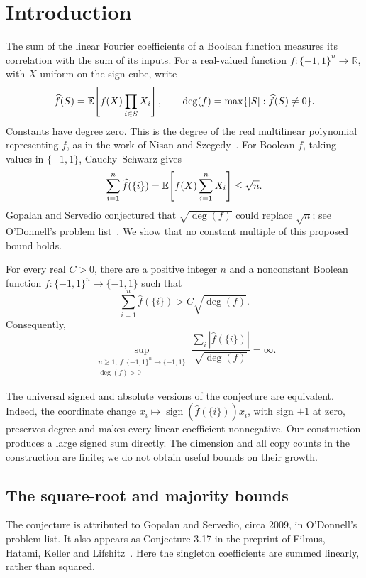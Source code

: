 \section{Introduction}

The sum of the linear Fourier coefficients of a Boolean function measures
its correlation with the sum of its inputs. For a real-valued function
\(f:\{-1,1\}^n\to\mathbb R\), with \(X\) uniform on the sign cube,
write
\[
 \widehat f(S)=\mathbb E\!\left[f(X)\prod_{i\in S}X_i\right],
 \qquad \deg(f)=\max\{|S|:\widehat f(S)\ne0\}.
\]
Constants have degree zero. This is the degree of the real multilinear
polynomial representing \(f\), as in the work of Nisan and
Szegedy~\cite{NisanSzegedy}. For Boolean \(f\), taking values in
\(\{-1,1\}\), Cauchy--Schwarz gives
\[
 \sum_{i=1}^n\widehat f(\{i\})
 =\mathbb E\!\left[f(X)\sum_{i=1}^nX_i\right]\le\sqrt n.
\]
Gopalan and Servedio conjectured that \(\sqrt{\deg(f)}\) could replace
\(\sqrt n\); see O'Donnell's problem list~\cite[p.~9]{ODonnell}.
We show that no constant multiple of this proposed bound holds.

\begin{theorem}\label{thm:main}
For every real \(C>0\), there are a positive integer \(n\) and a
nonconstant Boolean function \(f:\{-1,1\}^n\to\{-1,1\}\) such that
\[
 \sum_{i=1}^n\widehat f(\{i\})>C\sqrt{\deg(f)}.
\]
Consequently,
\[
 \sup_{\substack{n\ge1,\ f:\{-1,1\}^n\to\{-1,1\}\\\deg(f)>0}}
 \frac{\sum_i|\widehat f(\{i\})|}{\sqrt{\deg(f)}}=\infty.
\]
\end{theorem}

The universal signed and absolute versions of the conjecture are
equivalent. Indeed, the coordinate change
\(x_i\mapsto\operatorname{sign}(\widehat f(\{i\}))x_i\), with sign
\(+1\) at zero, preserves degree and makes every linear coefficient
nonnegative. Our construction produces a large signed sum directly.
The dimension and all copy counts in the
construction are finite; we do not obtain useful bounds on their growth.

\subsection*{The square-root and majority bounds}
The conjecture is attributed to Gopalan and Servedio, circa 2009, in
O'Donnell's problem list. It also appears as Conjecture 3.17 in the
preprint of Filmus, Hatami, Keller and Lifshitz~\cite{FHKL}.
Here the singleton coefficients are summed linearly, rather than squared.

